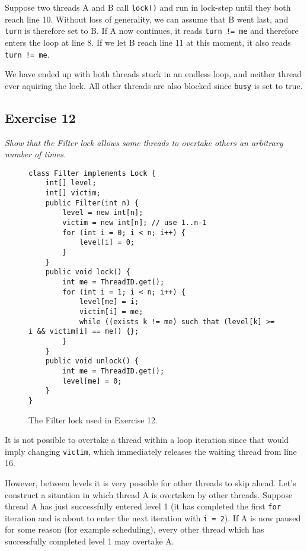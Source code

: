 \documentclass[a4paper,10pt]{article}
\begin{document}
\vspace{3mm}

Suppose two threads A and B call \lstinline|lock()| and run in lock-step until they both reach
line 10. Without loss of generality, we can assume that B went last, and \lstinline|turn|
is therefore set to B. If A now continues, it reads \lstinline|turn != me| and therefore enters
the loop at line 8. If we let B reach line 11 at this moment, it also reads \lstinline|turn != me|.

We have ended up with both threads stuck in an endless loop, and neither thread 
ever aquiring the lock. All other threads are also blocked since \lstinline|busy|
is set to true.

\subsection{Exercise 12}

\emph{Show that the Filter lock allows some threads to overtake others an
arbitrary number of times.}

\vspace{3mm}

\begin{figure}
\begin{lstlisting}
class Filter implements Lock {
    int[] level;
    int[] victim;
    public Filter(int n) {
        level = new int[n];
        victim = new int[n]; // use 1..n-1
        for (int i = 0; i < n; i++) {
            level[i] = 0;
        }
    }
    public void lock() {
        int me = ThreadID.get();
        for (int i = 1; i < n; i++) {
            level[me] = i;
            victim[i] = me;
            while ((exists k != me) such that (level[k] >= i && victim[i] == me)) {};
        }
    }
    public void unlock() {
        int me = ThreadID.get();
        level[me] = 0;
    }
}
\end{lstlisting}
\caption{The Filter lock used in Exercise 12.}
\label{fig:filter}
\end{figure}

It is not possible to overtake a thread within a loop iteration since that would
imply changing \lstinline|victim|, which immediately releases the waiting thread
from line 16.

However, between levels it is very possible for other threads to skip ahead.
Let's construct a situation in which thread A is overtaken by other threads.
Suppose thread A has just successfully entered level 1 (it has completed the first
\lstinline|for| iteration and is about to enter the next iteration with \lstinline|i = 2|).
If A is now paused for some reason (for example scheduling), every other thread
which has successfully completed level 1 may overtake A.
\end{document}
